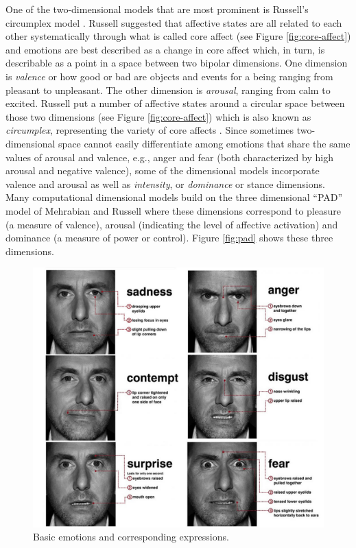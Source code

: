 \documentclass[11pt]{article}
\begin{document}
One of the two-dimensional models that are most prominent is Russell's
circumplex model \cite{russell:circumplex-affect}. Russell suggested that
affective states are all related to each other systematically through what is
called core affect \cite{russell:circumplex-affect,russell:core-affect} (see
Figure \ref{fig:core-affect}) and emotions are best described as a change in
core affect which, in turn, is describable as a point in a space between two
bipolar dimensions. One dimension is \textit{valence} or how good or bad are
objects and events for a being ranging from pleasant to unpleasant. The other
dimension is \textit{arousal}, ranging from calm to excited. Russell put a
number of affective states around a circular space between those two dimensions
(see Figure \ref{fig:core-affect}) which is also known as \textit{circumplex},
representing the variety of core affects
\cite{russell:circumplex-affect,russell:core-affect}. Since sometimes
two-dimensional space cannot easily differentiate among emotions that share the
same values of arousal and valence, e.g., anger and fear (both characterized by
high arousal and negative valence), some of the dimensional models incorporate
valence and arousal as well as \textit{intensity}, or \textit{dominance}
or stance dimensions. Many computational dimensional models build on the three
dimensional “PAD” model of Mehrabian and Russell \cite{mehrabian-russell:pad}
where these dimensions correspond to pleasure (a measure of valence), arousal
(indicating the level of affective activation) and dominance (a measure of power
or control). Figure \ref{fig:pad} shows these three dimensions.

\begin{figure}[tbh]
  \center
  \includegraphics[width=.9\textwidth]{figure/basic-emotions.jpg}
  \caption{Basic emotions and corresponding expressions.}
  \label{fig:basic-emotions}
\end{figure}
\end{document}

